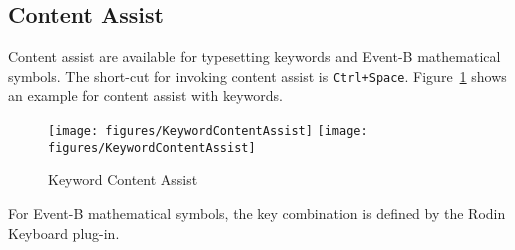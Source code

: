 \subsection{Content Assist}
\label{sec:content-assist}
Content assist are available for typesetting keywords and Event-B mathematical symbols. The short-cut for invoking content assist is \texttt{Ctrl+Space}.  Figure~\ref{fig:KeywordContentAssist} shows an example for content assist with keywords.
\begin{figure}[!htbp]
  \centering
  \texttt{[image: figures/KeywordContentAssist]}
  \endif
  \texttt{[image: figures/KeywordContentAssist]}
  \endif
  \caption{Keyword Content Assist}
  \label{fig:KeywordContentAssist}
\end{figure}
For Event-B mathematical symbols, the key combination is defined by the Rodin Keyboard plug-in.


